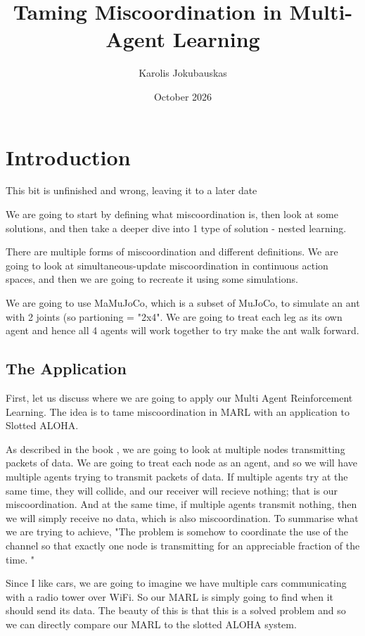 \documentclass{article}
\title{Taming Miscoordination in Multi-Agent Learning}
\author{Karolis Jokubauskas}
\date{October 2026}
\theoremstyle{definition}    %
\begin{document}
\maketitle

\tableofcontents

\newpage{}

\section{Introduction}

This bit is unfinished and wrong, leaving it to a later date

We are going to start by defining what miscoordination is, then look at some solutions, and then take a deeper dive into 1 type of solution - nested learning.

There are multiple forms of miscoordination and different definitions. We are going to look at simultaneous-update miscoordination in continuous action spaces, and then we are going to recreate it using some simulations.

We are going to use MaMuJoCo\cite{MaMuJoCo}, which is a subset of MuJoCo, to simulate an ant\cite{MaMuJoCo_Ant} with 2 joints (so partioning = "2x4". We are going to treat each leg as its own agent and hence all 4 agents will work together to try make the ant walk forward.

\subsection{The Application}
First, let us discuss where we are going to apply our Multi Agent Reinforcement Learning. The idea is to tame miscoordination in MARL with an application to Slotted ALOHA.

As described in the book \cite{bertsekas1992data}, we are going to look at multiple nodes transmitting packets of data. We are going to treat each node as an agent, and so we will have multiple agents trying to transmit packets of data. If multiple agents try at the same time, they will collide, and our receiver will recieve nothing; that is our miscoordination. And at the same time, if multiple agents transmit nothing, then we will simply receive no data, which is also miscoordination. To summarise what we are trying to achieve, "The problem is somehow to coordinate the use of the channel so that exactly one node is transmitting for an appreciable fraction of the time. " \cite{bertsekas1992data}

Since I like cars, we are going to imagine we have multiple cars communicating with a radio tower over WiFi. So our MARL is simply going to find when it should send its data. The beauty of this is that this is a solved problem and so we can directly compare our MARL to the slotted ALOHA system.
\end{document}
